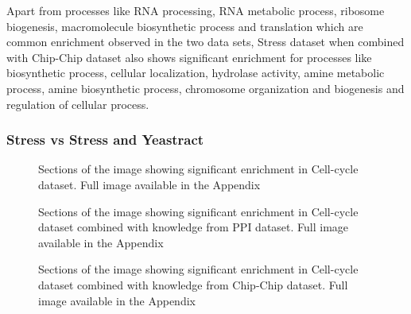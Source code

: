 Apart from processes like RNA processing, RNA metabolic process, ribosome biogenesis, macromolecule biosynthetic process and translation which are common enrichment observed 
in the two data sets, Stress dataset when combined with Chip-Chip dataset also shows significant enrichment for processes like biosynthetic process, cellular localization, 
hydrolase activity, amine metabolic process, amine biosynthetic process, chromosome organization and biogenesis and regulation of cellular process.

\subsubsection{Stress vs Stress and Yeastract}

\begin{figure}[p]
\centering
{}
\label{fig:ccycle_only_enrich}
\caption[]{Sections of the image showing significant enrichment in Cell-cycle dataset. Full image available in the Appendix}
\end{figure}

\begin{figure}[p]
\centering
{}
\label{fig:ccycle_ppi_enrich}
\caption[]{Sections of the image showing significant enrichment in Cell-cycle dataset combined with knowledge from PPI dataset. Full image available in the Appendix}
\end{figure}

\begin{figure}[p]
\centering
{}
\label{fig:ccycle_chip_enrich}
\caption[]{Sections of the image showing significant enrichment in Cell-cycle dataset combined with knowledge from Chip-Chip dataset. Full image available in the Appendix}
\end{figure}


